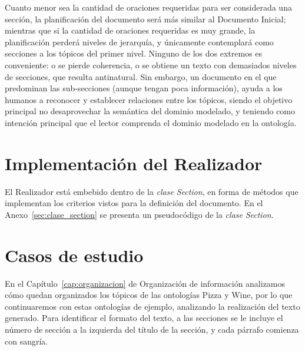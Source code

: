 
Cuanto menor sea la cantidad de oraciones requeridas para ser considerada una sección,  la planificación del documento será más similar al Documento Inicial; mientras que si la cantidad de  oraciones requeridas es muy grande, la planificación perderá niveles de jerarquía, y únicamente contemplará como secciones a los tópicos del primer nivel. Ninguno de los dos extremos es conveniente: o se pierde coherencia, o se obtiene un texto con demasiados niveles de secciones, que resulta antinatural. Sin embargo, un documento en el que predominan las sub-secciones (aunque tengan poca información), ayuda a los humanos a reconocer y establecer relaciones entre los tópicos, siendo el objetivo principal no desaprovechar la semántica del dominio modelado, y teniendo como intención principal que el lector comprenda el dominio modelado en la ontología.


\section{Implementación del Realizador}
El Realizador está embebido dentro de la \textit{clase }\textit{Section}, en forma de métodos que implementan los criterios vistos para la definición del documento. En el Anexo~\ref{sec:clase_section} se presenta un pseudocódigo de la\textit{ clase }\textit{Section}.

\section{Casos de estudio}
En el Capítulo~\ref{cap:organizacion} de Organización de información analizamos cómo quedan organizados los tópicos de las ontologías Pizza y Wine, por lo que continuaremos con estas ontologías de ejemplo, analizando la realización del texto generado. Para identificar el formato del texto, a las secciones se le incluye el número de sección a la izquierda del título de la sección, y cada párrafo comienza con sangría.

